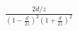 \documentclass[preview]{standalone}
\begin{document}
\begin{align*}
\frac{2d/z}{\left ( 1-\frac{d}{2z} \right )^{2}\left ( 1+\frac{d}{2z} \right )^{2}}
\end{align*}
\end{document}

